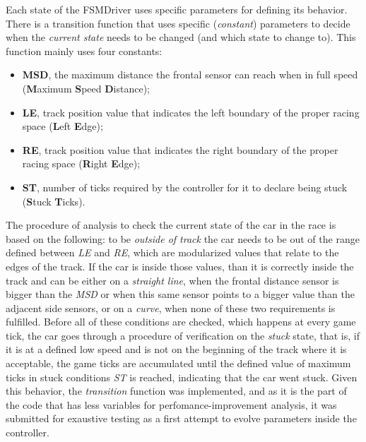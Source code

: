 	Each state of the FSMDriver uses specific parameters for defining its behavior. 
	There is a transition function that uses specific (\emph{constant}) parameters
	to decide when the \emph{current state} needs to be changed (and which state to
	change to). This function mainly uses four constants:
	\begin{itemize}
		\item \textbf{MSD}, the maximum distance the frontal sensor can reach when in full speed
		(\textbf{M}aximum \textbf{S}peed \textbf{D}istance);
		\item \textbf{LE}, track position value that indicates the left boundary of the proper racing
		space (\textbf{L}eft \textbf{E}dge);
		\item \textbf{RE}, track position value that indicates the right boundary of the proper racing
		space (\textbf{R}ight \textbf{E}dge);
		\item \textbf{ST}, number of ticks required by the controller for it to declare being stuck
		(\textbf{S}tuck \textbf{T}icks).
	\end{itemize}
	
	The procedure of analysis to check the current state of the car in the race is
	based on the following: to be \emph{outside of track} the car needs to be out of
	the range defined between \emph{LE} and \emph{RE}, which are modularized values
	that relate to the edges of the track. If the car is inside those values, than it
	is correctly inside the track and can be either on a \emph{straight line},
	when the frontal distance sensor is bigger than the \emph{MSD} or when this same
	sensor points to a bigger value than the adjacent side sensors, or on a
	\emph{curve}, when none of these two requirements is fulfilled. Before all of
	these conditions are checked, which happens at every game tick, the car goes through
	a procedure of verification on the \emph{stuck} state, that is, if it is at a defined
	low speed and is not on the beginning of the track where it is acceptable, the game
	ticks are accumulated until the defined value of maximum ticks in stuck conditions
	\emph{ST} is reached, indicating that the car went stuck. Given this behavior, the
	\emph{transition} function was implemented, and as it is the part of the code that
	has less variables for perfomance-improvement analysis, it was submitted for
	exaustive testing as a first attempt to evolve parameters inside the controller.
